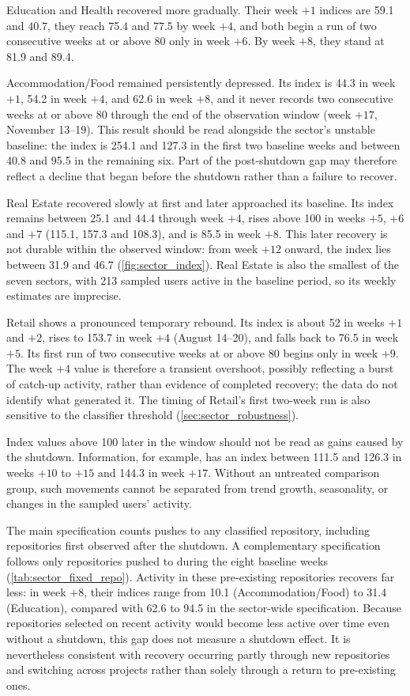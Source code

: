 Education and Health recovered more gradually. Their week $+1$ indices are 59.1 and 40.7, they reach 75.4 and 77.5 by week $+4$, and both begin a run of two consecutive weeks at or above 80 only in week $+6$. By week $+8$, they stand at 81.9 and 89.4.

Accommodation/Food remained persistently depressed. Its index is 44.3 in week $+1$, 54.2 in week $+4$, and 62.6 in week $+8$, and it never records two consecutive weeks at or above 80 through the end of the observation window (week $+17$, November 13--19). This result should be read alongside the sector's unstable baseline: the index is 254.1 and 127.3 in the first two baseline weeks and between 40.8 and 95.5 in the remaining six. Part of the post-shutdown gap may therefore reflect a decline that began before the shutdown rather than a failure to recover.

Real Estate recovered slowly at first and later approached its baseline. Its index remains between 25.1 and 44.4 through week $+4$, rises above 100 in weeks $+5$, $+6$ and $+7$ (115.1, 157.3 and 108.3), and is 85.5 in week $+8$. This later recovery is not durable within the observed window: from week $+12$ onward, the index lies between 31.9 and 46.7 (\cref{fig:sector_index}). Real Estate is also the smallest of the seven sectors, with 213 sampled users active in the baseline period, so its weekly estimates are imprecise.

Retail shows a pronounced temporary rebound. Its index is about 52 in weeks $+1$ and $+2$, rises to 153.7 in week $+4$ (August 14--20), and falls back to 76.5 in week $+5$. Its first run of two consecutive weeks at or above 80 begins only in week $+9$. The week $+4$ value is therefore a transient overshoot, possibly reflecting a burst of catch-up activity, rather than evidence of completed recovery; the data do not identify what generated it. The timing of Retail's first two-week run is also sensitive to the classifier threshold (\cref{sec:sector_robustness}).

Index values above 100 later in the window should not be read as gains caused by the shutdown. Information, for example, has an index between 111.5 and 126.3 in weeks $+10$ to $+15$ and 144.3 in week $+17$. Without an untreated comparison group, such movements cannot be separated from trend growth, seasonality, or changes in the sampled users' activity.

The main specification counts pushes to any classified repository, including repositories first observed after the shutdown. A complementary specification follows only repositories pushed to during the eight baseline weeks (\cref{tab:sector_fixed_repo}). Activity in these pre-existing repositories recovers far less: in week $+8$, their indices range from 10.1 (Accommodation/Food) to 31.4 (Education), compared with 62.6 to 94.5 in the sector-wide specification. Because repositories selected on recent activity would become less active over time even without a shutdown, this gap does not measure a shutdown effect. It is nevertheless consistent with recovery occurring partly through new repositories and switching across projects rather than solely through a return to pre-existing ones.

